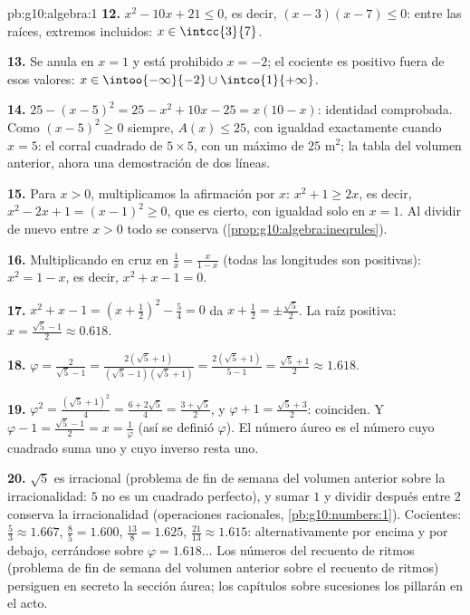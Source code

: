 \begin{solution}{pb:g10:algebra:1}
\textbf{12.} $x^2 - 10x + 21 \leq 0$, es decir, $(x - 3)(x - 7) \leq 0$:
entre las raíces, extremos incluidos: $x \in \intcc{3}{7}$.

\textbf{13.} Se anula en $x = 1$ y está prohibido $x = -2$; el cociente es
positivo fuera de esos valores:
$x \in \intoo{-\infty}{-2} \cup \intco{1}{+\infty}$.

\textbf{14.} $25 - (x - 5)^2 = 25 - x^2 + 10x - 25 = x(10 - x)$:
identidad comprobada. Como $(x-5)^2 \geq 0$ siempre, $A(x) \leq 25$, con
igualdad exactamente cuando $x = 5$: el corral cuadrado de $5 \times 5$,
con un máximo de $25$ m$^2$; la tabla del volumen anterior, ahora una
demostración de dos líneas.

\textbf{15.} Para $x > 0$, multiplicamos la afirmación por $x$:
$x^2 + 1 \geq 2x$, es decir, $x^2 - 2x + 1 = (x - 1)^2 \geq 0$, que es
cierto, con igualdad solo en $x = 1$. Al dividir de nuevo entre $x > 0$
todo se conserva (\cref{prop:g10:algebra:ineqrules}).

\textbf{16.} Multiplicando en cruz en $\frac1x = \frac{x}{1 - x}$ (todas
las longitudes son positivas): $x^2 = 1 - x$, es decir,
$x^2 + x - 1 = 0$.

\textbf{17.} $x^2 + x - 1 = \left(x + \frac12\right)^2 - \frac54 = 0$ da
$x + \frac12 = \pm\frac{\sqrt5}{2}$. La raíz positiva:
$x = \frac{\sqrt5 - 1}{2} \approx 0.618$.

\textbf{18.} $\varphi = \frac{2}{\sqrt5 - 1} =
\frac{2(\sqrt5 + 1)}{(\sqrt5 - 1)(\sqrt5 + 1)}
= \frac{2(\sqrt5 + 1)}{5 - 1} = \frac{\sqrt5 + 1}{2}
\approx 1.618$.

\textbf{19.} $\varphi^2 = \frac{(\sqrt5 + 1)^2}{4} =
\frac{6 + 2\sqrt5}{4} = \frac{3 + \sqrt5}{2}$, y
$\varphi + 1 = \frac{\sqrt5 + 3}{2}$: coinciden. Y
$\varphi - 1 = \frac{\sqrt5 - 1}{2} = x = \frac1\varphi$ (así se definió
$\varphi$). El número áureo es el número cuyo cuadrado suma uno y cuyo
inverso resta uno.

\textbf{20.} $\sqrt5$ es irracional (problema de fin de semana del volumen
anterior sobre la irracionalidad: $5$ no es un cuadrado perfecto), y
sumar $1$ y dividir después entre $2$ conserva la irracionalidad
(operaciones racionales, \cref{pb:g10:numbers:1}). Cocientes:
$\frac53 \approx 1.667$, $\frac85 = 1.600$, $\frac{13}{8} = 1.625$,
$\frac{21}{13} \approx 1.615$: alternativamente por encima y por debajo,
cerrándose sobre $\varphi = 1.618\ldots$ Los números del recuento de
ritmos (problema de fin de semana del volumen anterior sobre el recuento
de ritmos) persiguen en secreto la sección áurea; los capítulos sobre
sucesiones los pillarán en el acto.
\end{solution}
